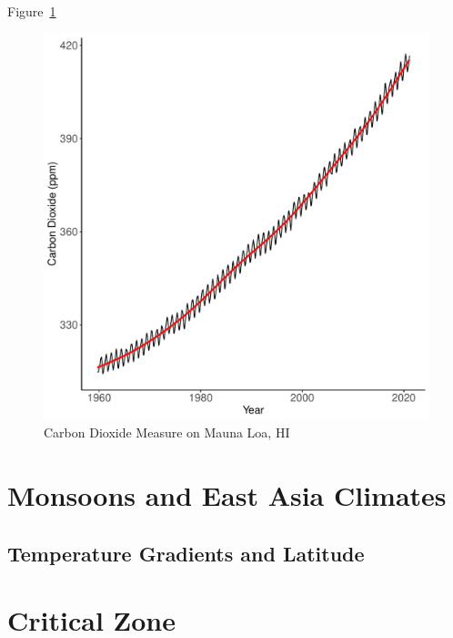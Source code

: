 \documentclass{book}\usepackage{knitr}
\begin{document}
\begin{knitrout}
\begin{kframe}
Figure~\ref{fig:maunaloa2}

\begin{figure}
\begin{knitrout}
\color{fgcolor}
\includegraphics[width=\maxwidth]{figure/maunaloa3-1} 

\end{knitrout}
\caption{Carbon Dioxide Measure on Mauna Loa, HI}
\label{fig:maunaloa2}
\end{figure}






\chapter{Monsoons and East Asia Climates}

\section{Temperature Gradients and Latitude}





\chapter{Critical Zone}\label{ch:critical-zone}


\end{kframe}
\end{knitrout}
\end{document}
